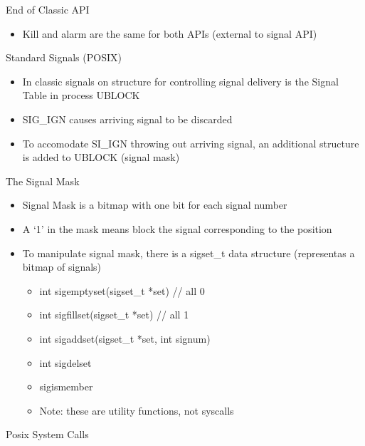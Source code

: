 End of Classic API
\begin{itemize}
    \item Kill and alarm are the same for both APIs (external to signal API)
\end{itemize}
Standard Signals (POSIX)
\begin{itemize}
    \item In classic signals on structure for controlling signal delivery is the Signal Table in process UBLOCK
    \item SIG\_IGN causes arriving signal to be discarded
    \item To accomodate SI\_IGN throwing out arriving signal, an additional structure is added to UBLOCK (signal mask)
\end{itemize}
The Signal Mask
\begin{itemize}
    \item Signal Mask is a bitmap with one bit for each signal number
    \item A `1' in the mask means block the signal corresponding to the position
    \item To manipulate signal mask, there is a sigset\_t data structure (representas a bitmap of signals)
    \begin{itemize}
        \item int sigemptyset(sigset\_t *set) // all 0
        \item int sigfillset(sigset\_t *set) // all 1
        \item int sigaddset(sigset\_t *set, int signum)
        \item int sigdelset
        \item sigismember
        \item Note: these are utility functions, not syscalls
    \end{itemize}
\end{itemize}
Posix System Calls
